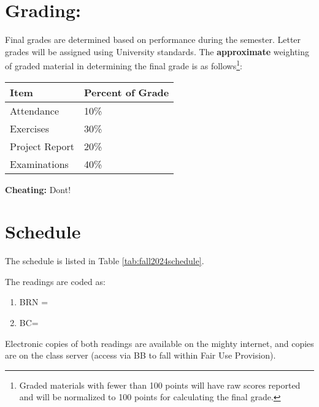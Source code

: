 \documentclass[12pt]{article}
\begin{document}
\section*{Grading:} Final grades are determined based on performance during the semester.  Letter grades will be assigned using University standards.  The \textbf{approximate} weighting of graded material in determining the final grade is as follows\footnote{Graded materials with fewer than 100 points will have raw scores reported and will be normalized to 100 points for calculating the final grade.}:
\begin{table}[h!]
   \centering
   \begin{tabular}{l l}
Item & Percent of Grade \\
\hline
\hline
Attendance & 10\% \\
Exercises & 30\% \\
Project Report & 20\% \\
Examinations & 40\% \\
\hline
\end{tabular}
\end{table}

\textbf{Cheating:} Dont!

\clearpage
\section*{Schedule}

The schedule is listed in Table \ref{tab:fall2024schedule}.

The readings are coded as:
\begin{enumerate}
\item BRN = \cite{BRN1999}
\item BC= \cite{Bear2010}
\end{enumerate}

Electronic copies of both readings are available on the mighty internet, and copies are on the class server (access via BB to fall within Fair Use Provision).  
\end{document}
